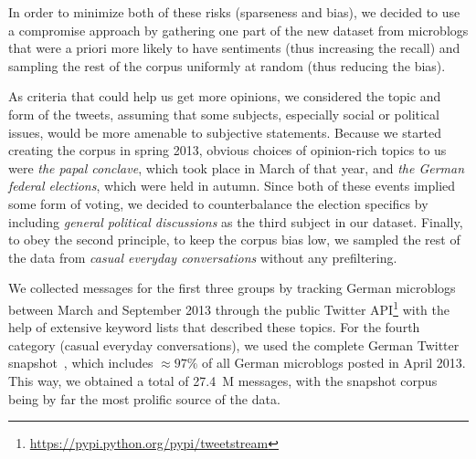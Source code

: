 In order to minimize both of these risks (sparseness and bias), we
decided to use a compromise approach by gathering one part of the new
dataset from microblogs that were a priori more likely to have
sentiments (thus increasing the recall) and sampling the rest of the
corpus uniformly at random (thus reducing the bias).

As criteria that could help us get more opinions, we considered the
topic and form of the tweets, assuming that some subjects, especially
social or political issues, would be more amenable to subjective
statements.  Because we started creating the corpus in spring 2013,
obvious choices of opinion-rich topics to us were \emph{the papal
  conclave}, which took place in March of that year, and \emph{the
  German federal elections}, which were held in autumn.  Since both of
these events implied some form of voting, we decided to counterbalance
the election specifics by including \emph{general political
  discussions} as the third subject in our dataset.  Finally, to obey
the second principle, \ie{} to keep the corpus bias low, we sampled
the rest of the data from \emph{casual everyday conversations} without
any prefiltering.

We collected messages for the first three groups by tracking German
microblogs between March and September 2013 through the public Twitter
API\footnote{\url{https://pypi.python.org/pypi/tweetstream}} with the
help of extensive keyword lists that described these topics.  For the
fourth category (casual everyday conversations), we used the complete
German Twitter snapshot~\cite{Scheffler:14}, which includes
$\approx97\%$ of all German microblogs posted in April 2013.  This
way, we obtained a total of 27.4~M messages, with the snapshot corpus
being by far the most prolific source of the data.


